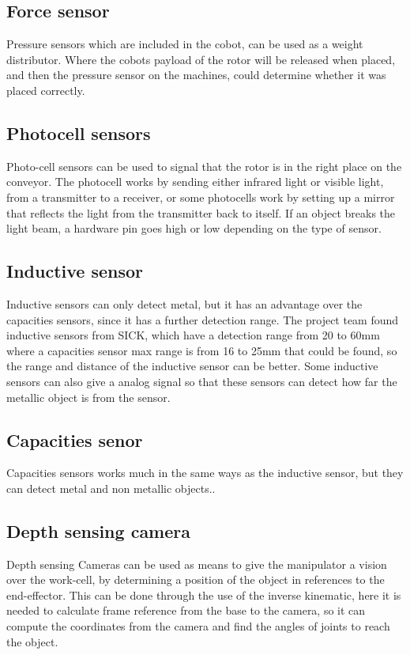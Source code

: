   \subsection{Force sensor} \label{pressure}
  Pressure sensors which are included in the cobot, can be used as a weight distributor. Where the cobots payload of the rotor will be released when placed, and then the pressure sensor on the machines, could determine whether it was placed correctly.\\
 
  \subsection{Photocell sensors} 
  Photo-cell sensors can be used to signal that the rotor is in the right place on the conveyor. The photocell works by sending either infrared light or visible light, from a transmitter to a receiver, or some photocells work by setting up a mirror that reflects the light from the transmitter back to itself. If an object breaks the light beam, a hardware pin goes high or low depending on the type of sensor\cite{SICKfo}. \\

 \subsection{Inductive sensor}
 Inductive sensors can only detect metal, but it has an advantage over the capacities sensors, since it has a further detection range. The project team found inductive sensors from SICK, which have a detection range from 20 to 60mm \cite{SICKin} where a capacities sensor max range is from 16 to 25mm \cite{SICKka} that could be found, so the range and distance of the inductive sensor can be better. Some inductive sensors can also give a analog signal so that these sensors can detect how far the metallic object is from the sensor\cite{SICKin}.\\ 

 \subsection{Capacities senor} 
 Capacities sensors works much in the same ways as the inductive sensor, but they can detect metal and non metallic objects.\cite{SICKka}.\\

 \subsection{Depth sensing camera} \label{depthcam}
 Depth sensing Cameras can be used as means to give the manipulator a vision over the work-cell, by determining a position of the object in references to the end-effector\cite{cam}. This can be done through the use of the inverse kinematic, here it is needed to calculate frame reference from the base to the camera, so it can compute the coordinates from the camera and find the angles of joints to reach the object\cite{JohnC}.\\
 

